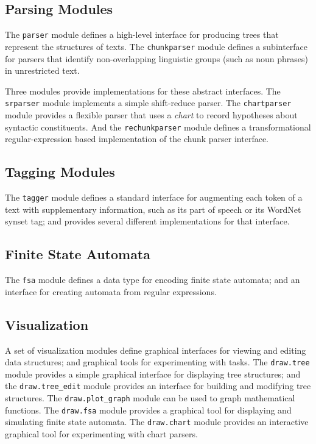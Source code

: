 \documentclass[11pt]{article}
\begin{document}
\subsection*{Parsing Modules}

The \texttt{parser} module defines a high-level interface for
producing trees that represent the structures of texts.  The
\texttt{chunkparser} module defines a subinterface for parsers that
identify non-overlapping linguistic groups (such as noun phrases) in
unrestricted text.

Three modules provide implementations for these abstract interfaces.
The \texttt{srparser} module implements a simple shift-reduce parser.
The \texttt{chartparser} module provides a flexible parser that uses a
\emph{chart} to record hypotheses about syntactic constituents.  And
the \texttt{rechunkparser} module defines a transformational
regular-expression based implementation of the chunk parser interface.

\subsection*{Tagging Modules}

The \texttt{tagger} module defines a standard interface for augmenting
each token of a text with supplementary information, such as its part
of speech or its WordNet synset tag; and provides several different
implementations for that interface.

\subsection*{Finite State Automata}

The \texttt{fsa} module defines a data type for encoding finite state
automata; and an interface for creating automata from
regular expressions.

\subsection*{Visualization}

A set of visualization modules define graphical interfaces for viewing
and editing data structures; and graphical tools for experimenting
with tasks.  The \texttt{draw.tree} module provides a simple graphical
interface for displaying tree structures; and the
\texttt{draw.tree\_edit} module provides an interface for building and
modifying tree structures.  The \texttt{draw.plot\_graph} module can be
used to graph mathematical functions.  The \texttt{draw.fsa} module
provides a graphical tool for displaying and simulating finite state
automata.  The \texttt{draw.chart} module provides an interactive
graphical tool for experimenting with chart parsers.
\end{document}

